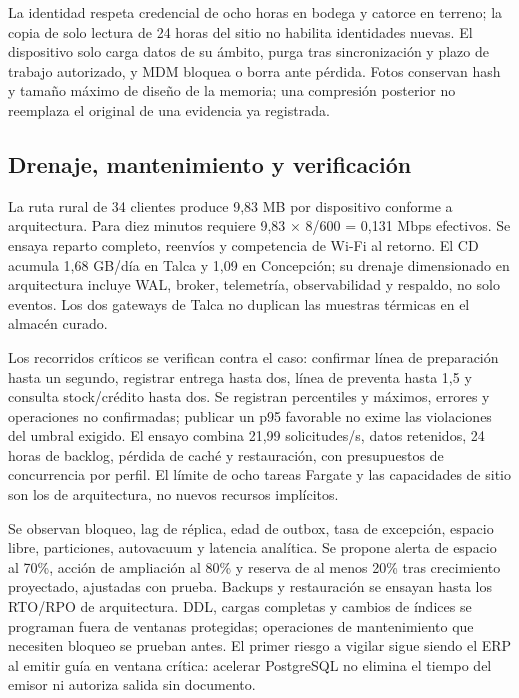 La identidad respeta credencial de ocho horas en bodega y catorce en terreno; la copia de solo lectura de 24 horas del sitio no habilita identidades nuevas. El dispositivo solo carga datos de su ámbito, purga tras sincronización y plazo de trabajo autorizado, y MDM bloquea o borra ante pérdida. Fotos conservan hash y tamaño máximo de diseño de la memoria; una compresión posterior no reemplaza el original de una evidencia ya registrada.

\subsection{Drenaje, mantenimiento y verificación}
La ruta rural de 34 clientes produce 9,83 MB por dispositivo conforme a arquitectura. Para diez minutos requiere 9,83 × 8/600 = 0,131 Mbps efectivos. Se ensaya reparto completo, reenvíos y competencia de Wi-Fi al retorno. El CD acumula 1,68 GB/día en Talca y 1,09 en Concepción; su drenaje dimensionado en arquitectura incluye WAL, broker, telemetría, observabilidad y respaldo, no solo eventos. Los dos gateways de Talca no duplican las muestras térmicas en el almacén curado.

Los recorridos críticos se verifican contra el caso: confirmar línea de preparación hasta un segundo, registrar entrega hasta dos, línea de preventa hasta 1,5 y consulta stock/crédito hasta dos. Se registran percentiles y máximos, errores y operaciones no confirmadas; publicar un p95 favorable no exime las violaciones del umbral exigido. El ensayo combina 21,99 solicitudes/s, datos retenidos, 24 horas de backlog, pérdida de caché y restauración, con presupuestos de concurrencia por perfil. El límite de ocho tareas Fargate y las capacidades de sitio son los de arquitectura, no nuevos recursos implícitos.

Se observan bloqueo, lag de réplica, edad de outbox, tasa de excepción, espacio libre, particiones, autovacuum y latencia analítica. Se propone alerta de espacio al 70\%, acción de ampliación al 80\% y reserva de al menos 20\% tras crecimiento proyectado, ajustadas con prueba. Backups y restauración se ensayan hasta los RTO/RPO de arquitectura. DDL, cargas completas y cambios de índices se programan fuera de ventanas protegidas; operaciones de mantenimiento que necesiten bloqueo se prueban antes. El primer riesgo a vigilar sigue siendo el ERP al emitir guía en ventana crítica: acelerar PostgreSQL no elimina el tiempo del emisor ni autoriza salida sin documento.
